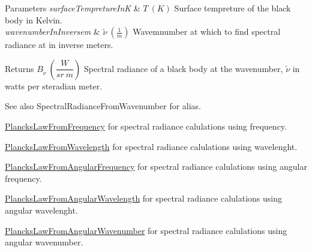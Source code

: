 \begin{DoxyParams}{Parameters}
{\em surface\+Tempreture\+InK} & $T\ (K)$ Surface tempreture of the black body in Kelvin. \\
\hline
{\em wavenumber\+In\+Inversem} & $\tilde {\nu }\ (\frac{1}{m})$ Wavemnumber at which to find spectral radiance at in inverse meters. \\
\hline
\end{DoxyParams}
\begin{DoxyReturn}{Returns}
$B_{\tilde {\nu }}\ ( \dfrac{W}{sr\ m})$ Spectral radiance of a black body at the wavenumber, $\tilde {\nu }$ in watts per steradian meter. 
\end{DoxyReturn}
\begin{DoxySeeAlso}{See also}
Spectral\+Radiance\+From\+Wavenumber for alias. 

\mbox{\hyperlink{group___e_g_x_phys-_electrodynamics-_black_body-_plancks_law_ga68aae82f8a086831358c4a61c8c80ba4}{Plancks\+Law\+From\+Frequency}} for spectral radiance calulations using frequency. 

\mbox{\hyperlink{group___e_g_x_phys-_electrodynamics-_black_body-_plancks_law_ga54639bc031ded51ef78aa82b0457a4dd}{Plancks\+Law\+From\+Wavelength}} for spectral radiance calulations using wavelenght. 

\mbox{\hyperlink{group___e_g_x_phys-_electrodynamics-_black_body-_plancks_law_gaac540560c71e30c02b91d22e417b5863}{Plancks\+Law\+From\+Angular\+Frequency}} for spectral radiance calulations using angular frequency. 

\mbox{\hyperlink{group___e_g_x_phys-_electrodynamics-_black_body-_plancks_law_ga7322124727f968d28807e918c5eeb23f}{Plancks\+Law\+From\+Angular\+Wavelength}} for spectral radiance calulations using angular wavelenght. 

\mbox{\hyperlink{group___e_g_x_phys-_electrodynamics-_black_body-_plancks_law_gaa3d3e0fdb77d25bdd40523f9975de902}{Plancks\+Law\+From\+Angular\+Wavenumber}} for spectral radiance calulations using angular wavenumber. 
\end{DoxySeeAlso}
